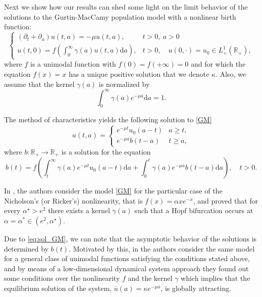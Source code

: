 \documentclass[a4paper,11pt]{article}
\theoremstyle{plain}
\theoremstyle{definition}
\theoremstyle{definition}
\newcommand{\R}{\mathbb{R}}
\newcommand{\ds}{\displaystyle}
\newcommand{\dd}{\mathrm{d}}
\numberwithin{equation}{section}
\begin{document}
Next we show how our results can shed some light on the limit behavior of the solutions to the Gurtin-MacCamy population model with a nonlinear birth function:
\begin{equation}\label{GM}
    \begin{cases}
        \ds (\partial_t + \partial_a)u(t,a) = -\mu u(t,a), & t>0,~ a>0 \\
        \ds u(t,0) = f\left( \int_0^\infty \gamma(a)u(t,a)\dd a \right), & t>0, \quad u(0,\cdot)=u_0\in L^1_+(\R_+),
    \end{cases}
\end{equation}
where $f$ is a unimodal function with $f(0)=f(+\infty)=0$ and for which the equation $f(x)=x$ has a unique positive solution that  we denote $\kappa$. Also, we assume that the kernel $\gamma(a)$ is normalized by
\[
    \int_0^\infty \gamma(a)e^{-\mu a}\dd a = 1.
\]

The method of characteristics yields the following solution to \eqref{GM}
\begin{equation}\label{eq:sol_GM}
    u(t,a) = \begin{cases}
        e^{-\mu t} u_0(a-t) & a\geq t,\\
        e^{-\mu a} b(t-a) & t\geq a,
    \end{cases}
\end{equation}
where $b\colon \R_+ \to \R_+$ is a solution for the equation
\begin{equation}\label{sol_b}
    b(t) = f\left( \int_t^{\infty} \gamma(a)e^{-\mu t} u_0(a-t)\dd a + \int_0^t \gamma(a)e^{-\mu a} b(t-a)\dd a \right), \quad t>0.
\end{equation}

In \cite{MMa}, the authors consider the model \eqref{GM} for the particular case of the Nicholson's (or Ricker's) nonlinearity, that is $f(x)=\alpha xe^{-x}$, and proved that for every $\alpha^\star>e^2$ there exists a kernel $\gamma(a)$ such that a Hopf bifurcation occurs at $\alpha=\alpha^*\in(e^2,\alpha^\star)$.

Due to \eqref{eq:sol_GM}, we can note that the asymptotic behavior of the solutions is determined by $b(t)$. Motivated by this, in \cite{HT} the authors consider the same model for a general class of unimodal functions satisfying the conditions stated above, and by means of a low-dimensional dynamical system approach they found out some conditions over the nonlinearity $f$ and the kernel $\gamma$ which implies that the equilibrium solution of the system, $\overline{u}(a)=\kappa e^{-\mu a}$, is globally attracting.
\end{document}
